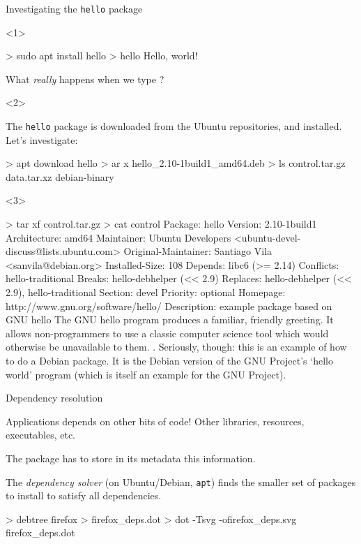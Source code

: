 \documentclass[compress]{beamer}
\begin{document}
\begin{frame}[fragile,label=deb]{Investigating the \texttt{hello} package}
    \begin{onlyenv}<1>

\begin{shcode}
> sudo apt install hello
> hello
Hello, world!
\end{shcode}

    What \emph{really} happens when we type ?

    \end{onlyenv}
    \begin{onlyenv}<2>

    The \texttt{hello} package is downloaded from the Ubuntu repositories, and
    installed. Let's investigate:

\begin{shcode}
> apt download hello
> ar x hello_2.10-1build1_amd64.deb
> ls
control.tar.gz  data.tar.xz  debian-binary
\end{shcode}

    \end{onlyenv}
    \begin{onlyenv}<3>


\begin{shcode}
> tar xf control.tar.gz
> cat control
Package: hello
Version: 2.10-1build1
Architecture: amd64
Maintainer: Ubuntu Developers <ubuntu-devel-discuss@lists.ubuntu.com>
Original-Maintainer: Santiago Vila <sanvila@debian.org>
Installed-Size: 108
Depends: libc6 (>= 2.14)
Conflicts: hello-traditional
Breaks: hello-debhelper (<< 2.9)
Replaces: hello-debhelper (<< 2.9), hello-traditional
Section: devel
Priority: optional
Homepage: http://www.gnu.org/software/hello/
Description: example package based on GNU hello
 The GNU hello program produces a familiar, friendly greeting.  It
 allows non-programmers to use a classic computer science tool which
 would otherwise be unavailable to them.
 .
 Seriously, though: this is an example of how to do a Debian package.
 It is the Debian version of the GNU Project's `hello world' program
 (which is itself an example for the GNU Project).
\end{shcode}

    \end{onlyenv}
\end{frame}

\begin{frame}[fragile]{Dependency resolution}

Applications depends on other bits of code! Other libraries, resources,
executables, etc.

The package has to store in its metadata this information.

The \emph{dependency solver} (on Ubuntu/Debian, \texttt{apt}) finds the
smaller set of packages to install to satisfy all dependencies.

\pause

\begin{shcode}
> debtree firefox > firefox_deps.dot
> dot -Tsvg -ofirefox_deps.svg firefox_deps.dot
\end{shcode}

\end{frame}
\end{document}
